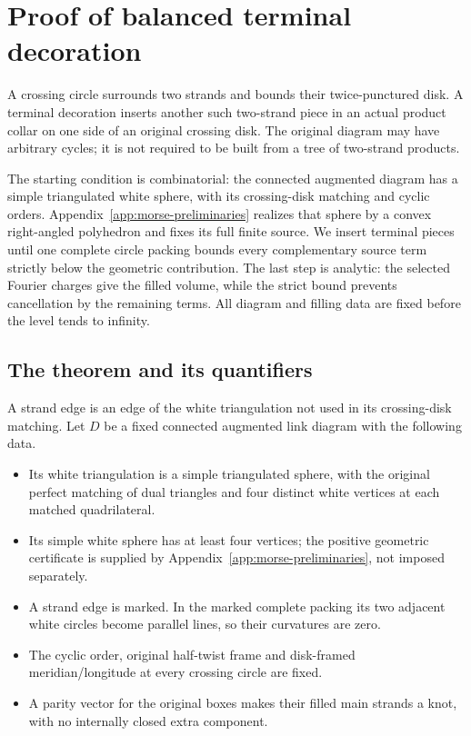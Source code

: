 \chapter{Proof of balanced terminal decoration}
\label{app:balanced-terminal-fans}\label{bl:proof-of-balanced-terminal-decoration}

A crossing circle surrounds two strands and bounds their twice-punctured disk. A terminal decoration inserts another such two-strand piece in an actual product collar on one side of an original crossing disk. The original diagram may have arbitrary cycles; it is not required to be built from a tree of two-strand products.

The starting condition is combinatorial: the connected augmented
diagram has a simple triangulated white sphere, with its crossing-disk
matching and cyclic orders. Appendix~\ref{app:morse-preliminaries} realizes that sphere by a convex
right-angled polyhedron and fixes its full finite source. We insert terminal pieces until one
complete circle packing bounds every complementary source term
strictly below the geometric contribution. The last step is analytic:
the selected Fourier charges give the filled volume, while the strict
bound prevents cancellation by the remaining terms. All diagram and
filling data are fixed before the level tends to infinity.

\section{The theorem and its quantifiers}\label{bl:the-theorem-and-its-quantifiers}

A strand edge is an edge of the white triangulation not used in its crossing-disk matching. Let \(D\) be a fixed connected augmented link diagram with the following data.

\begin{itemize}

\item
  Its white triangulation is a simple triangulated sphere, with the original perfect matching of dual triangles and four distinct white vertices at each matched quadrilateral.
\item
  Its simple white sphere has at least four vertices; the positive geometric certificate is supplied by Appendix~\ref{app:morse-preliminaries}, not imposed separately.
\item
  A strand edge is marked. In the marked complete packing its two
  adjacent white circles become parallel lines, so their curvatures are zero.
\item
  The cyclic order, original half-twist frame and disk-framed meridian/longitude at every crossing circle are fixed.
\item
  A parity vector for the original boxes makes their filled main strands a knot, with no internally closed extra component.
\end{itemize}

